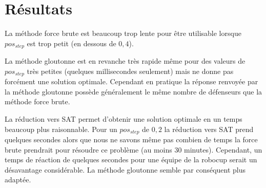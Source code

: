 \section{Résultats}

La méthode force brute est beaucoup trop lente pour être utilisable lorsque $pos_{step}$ est trop petit (en dessous de $0,4$). \newline

La méthode gloutonne est en revanche très rapide même pour des valeurs de $pos_{step}$ très petites (quelques millisecondes seulement) mais ne donne pas forcément une solution optimale. 
Cependant en pratique la réponse renvoyée par la méthode gloutonne possède généralement le même nombre de défenseurs que la méthode force brute. \newline

La réduction vers SAT permet d'obtenir une solution optimale en un temps beaucoup plus raisonnable. Pour un $pos_{step}$ de $0,2$ la réduction vers SAT prend quelques secondes alors que nous ne savons même pas combien de temps la force brute prendrait pour résoudre ce problème (au moins 30 minutes). Cependant, un temps de réaction de quelques secondes pour une équipe de la robocup serait un désavantage considérable. La méthode gloutonne semble par conséquent plus adaptée.